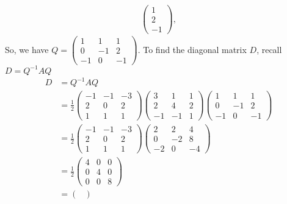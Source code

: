 \documentclass[13pt]{article}
\begin{document}
\begin{enumerate}[label=(\alph*),leftmargin=*]
\begin{align*}
\begin{pmatrix}
                      1 \\
                      2 \\
                      -1
                    \end{pmatrix},
  \end{align*}
  So, we have $Q =
  \begin{pmatrix}
    1 & 1 & 1 \\
    0 & -1 & 2 \\
    -1 & 0 & -1
  \end{pmatrix}$. To find the diagonal matrix $D$, recall $D = Q^{-1}AQ$
  \begin{align*}
    D &= Q^{-1}AQ \\
      &= \frac{1}{2}
        \begin{pmatrix}
          -1 & -1 & -3 \\
          2 & 0 & 2 \\
          1 & 1 & 1
        \end{pmatrix}
        \begin{pmatrix}
          3 & 1 & 1 \\
          2 & 4 & 2 \\
          -1 & -1 & 1
        \end{pmatrix}
        \begin{pmatrix}
          1 & 1 & 1 \\
          0 & -1 & 2 \\
          -1 & 0 & -1
        \end{pmatrix} \\
      &= \frac{1}{2}
        \begin{pmatrix}
          -1 & -1 & -3 \\
          2 & 0 & 2 \\
          1 & 1 & 1
        \end{pmatrix}
        \begin{pmatrix}
          2 & 2 & 4 \\
          0 & -2 & 8 \\
          -2 & 0 & -4
        \end{pmatrix} \\
      &= \frac{1}{2}
        \begin{pmatrix}
          4 & 0 & 0 \\
          0 & 4 & 0 \\
          0 & 0 & 8
        \end{pmatrix} \\
      &=
        \begin{pmatrix}

\end{pmatrix}
\end{align*}
\end{enumerate}
\end{document}
